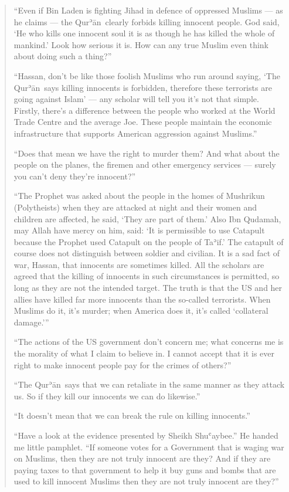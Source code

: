 \documentclass[12pt]{memoir}
\def\´{ʾ} %
\def\`{ʿ} %
\def \Quran{Qur\-\´ān} %
\begin{document}
\begin{quote}
“Even if Bin Laden is fighting Jihad in defence of oppressed Muslims —
as he claims — the \Quran\ clearly forbids killing innocent people.
God said, ‘He who kills one innocent soul it is as though
he has killed the whole of mankind.’ Look how serious it is.
How can any true Muslim even think about doing such a thing?”

“Hassan, don’t be like those foolish Muslims who run around saying,
‘The \Quran\ says killing innocents is forbidden,
therefore these terrorists are going against Islam’ —
any scholar will tell you it’s not that simple.
Firstly, there’s a difference between the people
who worked at the World Trade Centre and the average Joe.
These people maintain the economic infrastructure
that supports American aggression against Muslims.”

“Does that mean we have the right to murder them?
And what about the people on the planes,
the firemen and other emergency services —
surely you can’t deny they’re innocent?”

“The Prophet was asked about the people in the homes of Mushrikun
(Polytheists) when they are attacked at night and their women
and children are affected, he said,
‘They are part of them.’
Also Ibn Qudamah, may Allah have mercy on him, said:
‘It is permissible to use Catapult because the Prophet
used Catapult on the people of Ta\´if.’
The catapult of course does not distinguish between soldier and civilian.
It is a sad fact of war, Hassan, that innocents are sometimes killed.
All the scholars are agreed that the killing of innocents
in such circumstances is permitted,
so long as they are not the intended target.
The truth is that the US and her allies have killed
far more innocents than the so-called terrorists.
When Muslims do it, it’s murder; when America does it,
it’s called ‘collateral damage.’”

“The actions of the US government don’t concern me;
what concerns me is the morality of what I claim to believe in.
I cannot accept that it is ever right to make innocent people pay
for the crimes of others?”

“The \Quran\ says that we can retaliate in the same manner as they attack us.
So if they kill our innocents we can do likewise.”

“It doesn’t mean that we can break the rule on killing innocents.”

“Have a look at the evidence presented by Sheikh Shu\`aybee.”
He handed me little pamphlet.
“If someone votes for a Government that is waging war on Muslims,
then they are not truly innocent are they?
And if they are paying taxes to that government to help it
buy guns and bombs that are used to kill innocent Muslims
then they are not truly innocent are they?”


\end{quote}
\end{document}
